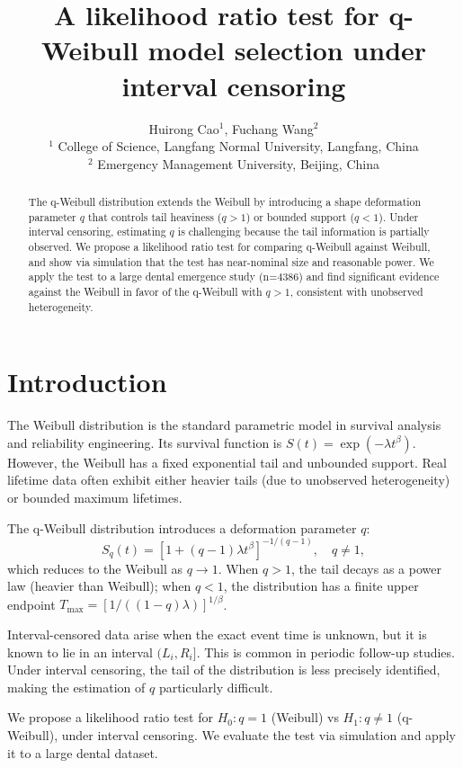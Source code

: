 \documentclass[11pt,a4paper]{article}
\title{A likelihood ratio test for q-Weibull model selection under interval censoring}
\author{Huirong Cao$^{1}$, Fuchang Wang$^{2}$\\
$^{1}$ College of Science, Langfang Normal University, Langfang, China\\
$^{2}$ Emergency Management University, Beijing, China}
\date{}
\begin{document}
\maketitle

\begin{abstract}
The q-Weibull distribution extends the Weibull by introducing a shape deformation parameter $q$ that controls tail heaviness ($q>1$) or bounded support ($q<1$). Under interval censoring, estimating $q$ is challenging because the tail information is partially observed. We propose a likelihood ratio test for comparing q-Weibull against Weibull, and show via simulation that the test has near-nominal size and reasonable power. We apply the test to a large dental emergence study (n=4386) and find significant evidence against the Weibull in favor of the q-Weibull with $q>1$, consistent with unobserved heterogeneity.
\end{abstract}

\section{Introduction}

The Weibull distribution is the standard parametric model in survival analysis and reliability engineering. Its survival function is $S(t)=\exp(-\lambda t^\beta)$. However, the Weibull has a fixed exponential tail and unbounded support. Real lifetime data often exhibit either heavier tails (due to unobserved heterogeneity) or bounded maximum lifetimes.

The q-Weibull distribution \citep{picoli2003q} introduces a deformation parameter $q$:
\begin{equation}
S_q(t) = \left[1 + (q-1)\lambda t^\beta\right]^{-1/(q-1)}, \quad q \neq 1,
\end{equation}
which reduces to the Weibull as $q \to 1$. When $q>1$, the tail decays as a power law (heavier than Weibull); when $q<1$, the distribution has a finite upper endpoint $T_{\max} = [1/((1-q)\lambda)]^{1/\beta}$.

Interval-censored data arise when the exact event time is unknown, but it is known to lie in an interval $(L_i, R_i]$. This is common in periodic follow-up studies. Under interval censoring, the tail of the distribution is less precisely identified, making the estimation of $q$ particularly difficult.

We propose a likelihood ratio test for $H_0: q=1$ (Weibull) vs $H_1: q \neq 1$ (q-Weibull), under interval censoring. We evaluate the test via simulation and apply it to a large dental dataset.
\end{document}
